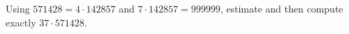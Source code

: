 Using $571428=4\cdot142857$ and $7\cdot142857=999999$, estimate and then compute exactly $37\cdot571428$.
